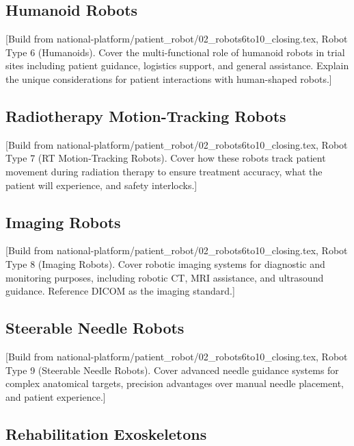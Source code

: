 \subsection{Humanoid Robots}
\label{subsec:instructions-humanoid}

[Build from national-platform/patient\_robot/02\_robots6to10\_closing.tex,
Robot Type 6 (Humanoids). Cover the multi-functional role of humanoid robots
in trial sites including patient guidance, logistics support, and general
assistance. Explain the unique considerations for patient interactions with
human-shaped robots.]

\subsection{Radiotherapy Motion-Tracking Robots}
\label{subsec:instructions-rt-tracking}

[Build from national-platform/patient\_robot/02\_robots6to10\_closing.tex,
Robot Type 7 (RT Motion-Tracking Robots). Cover how these robots track
patient movement during radiation therapy to ensure treatment accuracy,
what the patient will experience, and safety interlocks.]

\subsection{Imaging Robots}
\label{subsec:instructions-imaging}

[Build from national-platform/patient\_robot/02\_robots6to10\_closing.tex,
Robot Type 8 (Imaging Robots). Cover robotic imaging systems for diagnostic
and monitoring purposes, including robotic CT, MRI assistance, and
ultrasound guidance. Reference DICOM \cite{dicom} as the imaging standard.]

\subsection{Steerable Needle Robots}
\label{subsec:instructions-steerable}

[Build from national-platform/patient\_robot/02\_robots6to10\_closing.tex,
Robot Type 9 (Steerable Needle Robots). Cover advanced needle guidance
systems for complex anatomical targets, precision advantages over manual
needle placement, and patient experience.]

\subsection{Rehabilitation Exoskeletons}
\label{subsec:instructions-rehab}


